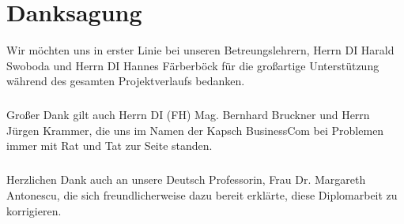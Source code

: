 \chapter{Danksagung}
Wir möchten uns in erster Linie bei unseren Betreungslehrern, Herrn DI Harald Swoboda und Herrn DI Hannes Färberböck für die großartige Unterstützung während des gesamten Projektverlaufs bedanken.
\paragraph*{}
Großer Dank gilt auch Herrn DI (FH) Mag. Bernhard Bruckner und \newline Herrn Jürgen Krammer, die uns im Namen der Kapsch BusinessCom bei Problemen immer mit Rat und Tat zur Seite standen.
\paragraph*{}
Herzlichen Dank auch an unsere Deutsch Professorin, Frau Dr. Margareth Antonescu, die sich freundlicherweise dazu bereit erklärte, diese Diplomarbeit zu korrigieren.

